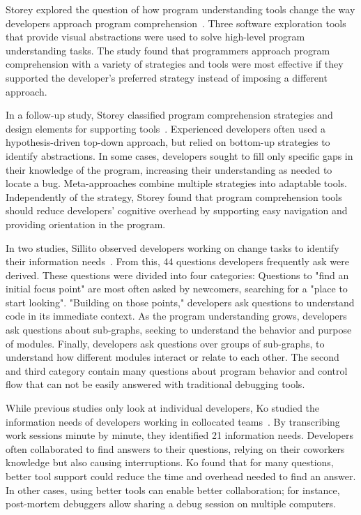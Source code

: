 Storey \etal explored the question of how program understanding tools change the way developers approach program comprehension~\cite{storey97:how_do_program_understanding}.
Three software exploration tools that provide visual abstractions were used to solve high-level program understanding tasks.
The study found that programmers approach program comprehension with a variety of strategies and tools were most effective if they supported the developer's preferred strategy instead of imposing a different approach.

In a follow-up study, Storey \etal classified program comprehension strategies and design elements for supporting tools~\cite{storey99:cognitive_design_elements}.
Experienced developers often used a hypothesis-driven top-down approach, but relied on bottom-up strategies to identify abstractions.
In some cases, developers sought to fill only specific gaps in their knowledge of the program, increasing their understanding as needed to locate a bug.
Meta-approaches combine multiple strategies into adaptable tools.
Independently of the strategy, Storey \etal found that program comprehension tools should reduce developers' cognitive overhead by supporting easy navigation and providing orientation in the program.

In two studies, Sillito \etal observed developers working on change tasks to identify their information needs~\cite{sillito06:questions_programmers_ask}.
From this, 44 questions developers frequently ask were derived.
These questions were divided into four categories:
Questions to "find an initial focus point" are most often asked by newcomers, searching for a "place to start looking".
"Building on those points," developers ask questions to understand code in its immediate context.
As the program understanding grows, developers ask questions about sub-graphs, seeking to understand the behavior and purpose of modules.
Finally, developers ask questions over groups of sub-graphs, to understand how different modules interact or relate to each other.
The second and third category contain many questions about program behavior and control flow that can not be easily answered with traditional debugging tools.

While previous studies only look at individual developers, Ko \etal studied the information needs of developers working in collocated teams~\cite{ko07:information_needs_in_collocated}.
By transcribing work sessions minute by minute, they identified 21 information needs.
Developers often collaborated to find answers to their questions, relying on their coworkers knowledge but also causing interruptions.
Ko \etal found that for many questions, better tool support could reduce the time and overhead needed to find an answer.
In other cases, using better tools can enable better collaboration; for instance, post-mortem debuggers allow sharing a debug session on multiple computers.


